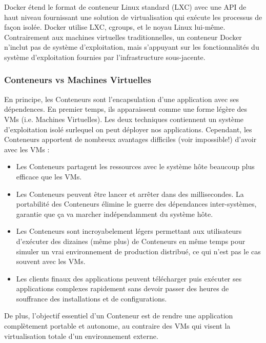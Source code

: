 \documentclass[a4paper,11pt,oneside]{report}
\begin{document}
Docker étend le format de conteneur Linux standard (LXC) avec une API de haut niveau fournissant une solution de virtualisation qui exécute les processus de façon isolée. Docker utilise LXC, cgroups, et le noyau Linux lui-même. Contrairement aux machines virtuelles traditionnelles, un conteneur Docker n'inclut pas de système d'exploitation,  mais s'appuyant sur les fonctionnalités du système d’exploitation fournies par l'infrastructure sous-jacente.

\subsubsection{Conteneurs vs Machines Virtuelles}
En principe, les Conteneurs sont l'encapsulation d'une application avec ses dépendences. En premier temps, ils apparaissent comme une forme légère des VMs (i.e. Machines Virtuelles). Les deux techniques contiennent un système d'exploitation isolé surlequel on peut déployer nos applications. Cependant, les Conteneurs apportent de nombreux avantages difficiles (voir impossible!) d'avoir avec les VMs :
\begin{itemize}
\item Les Conteneurs partagent les ressources avec le système hôte beaucoup plus efficace que les VMs. 
\item Les Conteneurs peuvent être lancer et arrêter dans des millisecondes. 
La portabilité des Conteneurs élimine le guerre des dépendances inter-systèmes, garantie que ça va marcher indépendamment du système hôte. 
\item Les Conteneurs sont incroyabelement légers permettant aux utilisateurs d'exécuter des dizaines (même plus) de Conteneurs en même temps pour simuler un vrai environnement de production distribué, ce qui n'est pas le cas souvent avec les VMs. 
\item Les clients finaux des applications peuvent télécharger puis exécuter ses applications complexes rapidement sans devoir passer des heures de souffrance des installations et de configurations. 
\newline
\end{itemize}

De plus, l'objectif essentiel d'un Conteneur est de rendre une application complètement portable et autonome, au contraire des VMs qui visent la virtualisation totale d'un environnement externe.
\end{document}
